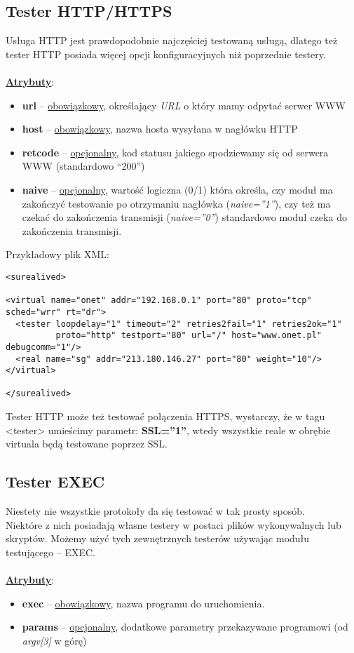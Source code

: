 \documentclass[polish,12pt]{article}
\begin{document}
\subsection{Tester HTTP/HTTPS}
Usługa HTTP jest prawdopodobnie najczęściej testowaną usługą, dlatego też tester HTTP posiada więcej opcji
konfiguracyjnych niż poprzednie testery.\\
\\\underline{\textbf{Atrybuty}}:
\begin{itemize}
  \item \textbf{url} -- \underline{obowiązkowy}, określający \textit{URL} o który mamy odpytać serwer WWW
  \item \textbf{host} -- \underline{obowiązkowy}, nazwa hosta wysyłana w nagłówku HTTP
  \item \textbf{retcode} -- \underline{opcjonalny}, kod statusu jakiego spodziewamy się od serwera WWW (standardowo ``200'')
  \item \textbf{naive} -- \underline{opcjonalny}, wartość logiczna (0/1) która określa, czy moduł ma zakończyć testowanie
    po otrzymaniu nagłówka (\textit{naive=''1''}), czy też ma czekać do zakończenia transmisji
    (\textit{naive=''0''}) standardowo moduł czeka do zakończenia transmisji.
\end{itemize}
Przykładowy plik XML:
{\footnotesize
\begin{verbatim}
<surealived>

<virtual name="onet" addr="192.168.0.1" port="80" proto="tcp" sched="wrr" rt="dr">
  <tester loopdelay="1" timeout="2" retries2fail="1" retries2ok="1"
          proto="http" testport="80" url="/" host="www.onet.pl" debugcomm="1"/>
  <real name="sg" addr="213.180.146.27" port="80" weight="10"/>
</virtual>

</surealived>
\end{verbatim}
}

Tester HTTP może też testować połączenia HTTPS, wystarczy, że w tagu <tester> umieścimy parametr:
\textbf{SSL=''1''}, wtedy wszystkie reale w obrębie virtuala będą testowane poprzez SSL.
\newpage
\subsection{Tester EXEC}
Niestety nie wszystkie protokoły da się testować w tak prosty sposób.\\
Niektóre z nich posiadają własne testery w postaci plików wykonywalnych lub skryptów.
Możemy użyć tych zewnętrznych testerów używając modułu testującego -- EXEC.\\
\\\underline{\textbf{Atrybuty}}:
\begin{itemize}
  \item \textbf{exec} -- \underline{obowiązkowy}, nazwa programu do uruchomienia.
  \item \textbf{params} -- \underline{opcjonalny}, dodatkowe parametry przekazywane programowi (od \textit{argv[3]} w górę)
\end{itemize}
\end{document}
